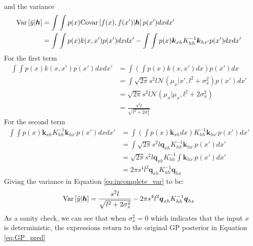 \documentclass{article}
\begin{document}
\begin{appendices}
\begin{equation}
\begin{aligned}
        \end{aligned}
    \end{equation}
    and the variance
    \begin{equation}
        \begin{aligned}
            \text{Var}\left[\Tilde{y}|\boldsymbol{h}\right]&=\int\int p(x)\text{Covar}\left[f(x),f(x')|\boldsymbol{h}\right]p(x')dxdx' \\
            &=\int\int p(x)k(x,x')p(x')dxdx'-\int\int p(x)\boldsymbol{k}_{xh}K_{hh}^{-1}\boldsymbol{k}_{hx'}p(x')dxdx'
        \label{eq:incomplete_var}
        \end{aligned}
    \end{equation}
    For the first term 
    \begin{equation}
        \begin{aligned}
            \int\int p(x)k(x,x')p(x')dxdx'&=\int\left(\int p(x)k(x,x')dx\right)p(x')dx \\
            &=\int \sqrt{2\pi}s^2l\mathcal{N}(\mu_x|x',l^2 + \sigma_x^2)p(x')dx' \\
            &=\sqrt{2\pi}s^2l\mathcal{N}(\mu_x|\mu_x,l^2+2\sigma_x^2) \\
            &=\frac{s^2l}{\sqrt{l^2+2\sigma_x^2}}
        \end{aligned}
    \end{equation}
    For the second term 
    \begin{equation}
        \begin{aligned}
            \int\int p(x)\boldsymbol{k}_{xh}K_{hh}^{-1}\boldsymbol{k}_{hx'}p(x')dxdx' 
            &=\int\left(\int p(x)\boldsymbol{k}_{xh}dx\right)K_{hh}^{-1}\boldsymbol{k}_{hx'}p(x')dx' \\
            &=\int \sqrt{2\pi}s^2l\boldsymbol{q}_{xh}K_{hh}^{-1}\boldsymbol{k}_{hx'}p(x')dx' \\
            &=\sqrt{2\pi}s^2l\boldsymbol{q}_{xh}K_{hh}^{-1} \int \boldsymbol{k}_{hx'}p(x')dx' \\
            &=2\pi s^4 l^2 \boldsymbol{q}_{xh}K_{hh}^{-1}\boldsymbol{q}_{hx}
        \end{aligned}
    \end{equation}
    Giving the variance in Equation \ref{eq:incomplete_var} to be:
    \begin{equation}
        \text{Var}\left[\Tilde{y}|\boldsymbol{h}\right]=\frac{s^2l}{\sqrt{l^2+2\sigma_x^2}} - 2\pi s^4 l^2 \boldsymbol{q}_{xh}K_{hh}^{-1}\boldsymbol{q}_{hx}
    \end{equation}
    As a sanity check, we can see that when $\sigma_x^2=0$ which indicates that the input $x$ is deterministic, the expressions return to the original GP posterior in Equation \ref{eq:GP_pred}
\end{appendices}
\end{document}
